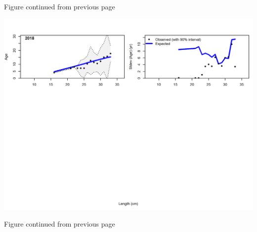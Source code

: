 \documentclass[12pt,]{article}
\begin{document}
\begin{center} 

              Figure continued from previous page 

             \end{center}

\includegraphics{./r4ss/plots_mod1/comp_condAALfit_Andre_plotsflt9mkt0_page3.png}

\begin{center} 

              Figure continued from previous page 

             \end{center}
\end{document}
